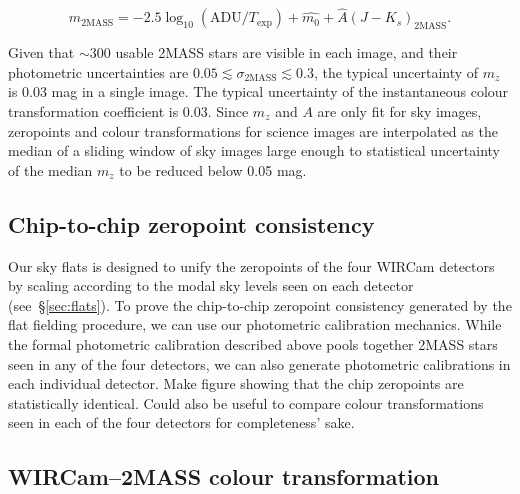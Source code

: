 \documentclass[iop]{emulateapj}
\newcommand{\todo}[1]{\textcolor{RedOrange}{#1}} %
\newcommand{\Sec}[1]{\S\ref{sec:#1}}  %
\begin{document}
\begin{equation}
  \label{eq:photcal}
  m_\mathrm{2MASS} = -2.5 \log_{10}(\mathrm{ADU}/T_\mathrm{exp}) + \hat{m_0} + \hat{A} (J-K_s)_\mathrm{2MASS}.
\end{equation}

Given that $\sim 300$ usable 2MASS stars are visible in each image, and their photometric uncertainties are $0.05 \lesssim \sigma_{\mathrm{2MASS}} \lesssim 0.3$, the typical uncertainty of $m_z$ is 0.03 mag in a single image. The typical uncertainty of the instantaneous colour transformation coefficient is 0.03. Since $m_z$ and $A$ are only fit for sky images, zeropoints and colour transformations for science images are interpolated as the median of a sliding window of sky images large enough to statistical uncertainty of the median $m_z$ to be reduced below 0.05 mag.

\subsection{Chip-to-chip zeropoint consistency}
\label{sec:chip_zp}

Our sky flats is designed to unify the zeropoints of the four WIRCam detectors by scaling according to the modal sky levels seen on each detector (see~\Sec{flats}).
To prove the chip-to-chip zeropoint consistency generated by the flat fielding procedure, we can use our photometric calibration mechanics.
While the formal photometric calibration described above pools together 2MASS stars seen in any of the four detectors, we can also generate photometric calibrations in each individual detector.
\todo{Make figure showing that the chip zeropoints are statistically identical. Could also be useful to compare colour transformations seen in each of the four detectors for completeness' sake.}

\subsection{WIRCam--2MASS colour transformation}
\label{sec:color_trans}
\end{document}
